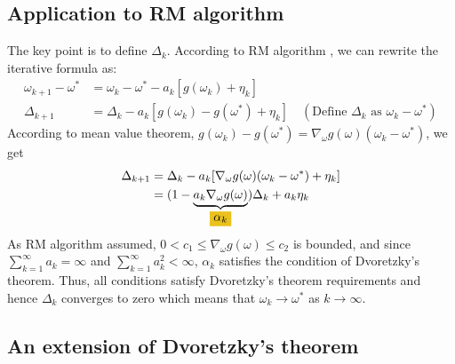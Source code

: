   \subsection{Application to RM algorithm}

    The key point is to define $\Delta_{k}$. According to RM algorithm , we can rewrite the iterative formula as:
    \begin{align*}
      \omega_{k+1} - \omega^{*} & = \omega_{k} - \omega^{*} - a_{k}[g(\omega_{k})+\eta_{k}]                                                                      \\
      \Delta_{k+1}              & = \Delta_{k} - a_{k}[g(\omega_{k})-g(\omega^{*})+\eta_{k}] \quad (\text{Define } \Delta_{k} \text{ as } \omega_{k}-\omega^{*})
    \end{align*}
    According to mean value theorem, $g(\omega_{k})-g(\omega^{*})=\nabla_{\omega} g(\omega)(\omega_{k}-\omega^{*})$, we get
    \begin{align*}
      \Delta_{k+1} & = \Delta_{k} - a_{k}[\nabla_{\omega} g(\omega)(\omega_{k}-\omega^{*})+\eta_{k}]                                           \\
                   & = (1-\underbrace{a_{k}\nabla_{\omega} g(\omega)}_{\colorbox{myyellow!80!myred}{$\alpha_{k}$}}) \Delta_{k} + a_{k}\eta_{k}
    \end{align*}
    As RM algorithm assumed, $0<c_{1}\le \nabla_{\omega} g(\omega) \le c_{2}$ is bounded, and since
    $\sum_{k=1}^{\infty}a_{k}=\infty$ and $\sum_{k=1}^{\infty}a_{k}^{2}<\infty$, $\alpha_{k}$ satisfies the condition of
    Dvoretzky's theorem. Thus, all conditions satisfy Dvoretzky's theorem requirements  and hence $\Delta_{k}$ converges to zero which means that $\omega_{k}
      \to \omega^{*}$ as $k\to \infty$.

  \subsection{An extension of Dvoretzky's theorem}

